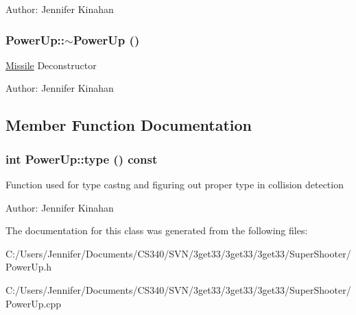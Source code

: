 Author: Jennifer Kinahan \hypertarget{class_power_up_a353053fe27c5a148a2fcd4f5f45e19af}{
\subsubsection[{$\sim$PowerUp}]{\setlength{\rightskip}{0pt plus 5cm}PowerUp::$\sim$PowerUp ()}}
\label{class_power_up_a353053fe27c5a148a2fcd4f5f45e19af}
\hyperlink{class_missile}{Missile} Deconstructor

Author: Jennifer Kinahan 

\subsection{Member Function Documentation}
\hypertarget{class_power_up_a8a5992a811184eb348f934d6a07b73c0}{
\subsubsection[{type}]{\setlength{\rightskip}{0pt plus 5cm}int PowerUp::type () const}}
\label{class_power_up_a8a5992a811184eb348f934d6a07b73c0}
Function used for type castng and figuring out proper type in collision detection

Author: Jennifer Kinahan 

The documentation for this class was generated from the following files:\begin{DoxyCompactItemize}
\item 
C:/Users/Jennifer/Documents/CS340/SVN/3get33/3get33/3get33/SuperShooter/PowerUp.h\item 
C:/Users/Jennifer/Documents/CS340/SVN/3get33/3get33/3get33/SuperShooter/PowerUp.cpp\end{DoxyCompactItemize}

